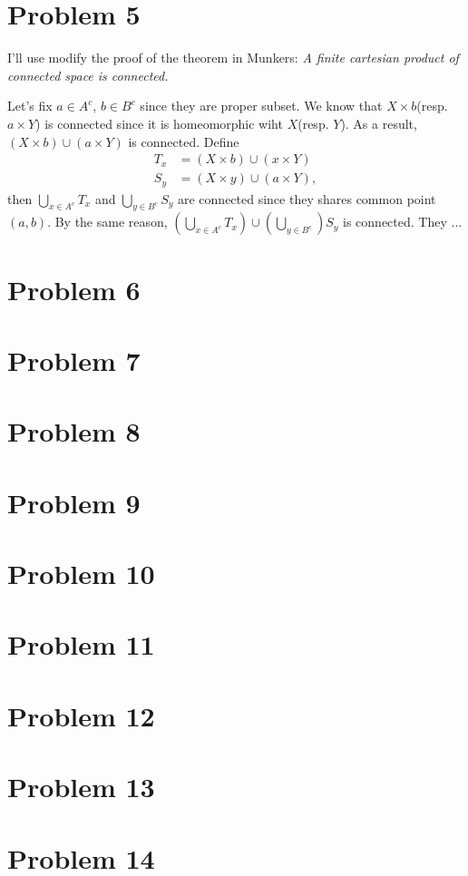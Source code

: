 \documentclass{article}
\begin{document}
\section*{Problem 5}
I'll use modify the proof of the theorem in Munkers: \textit{A finite cartesian product of connected space is connected.}

Let's fix $a\in A^c$, $b\in B^c$ since they are proper subset. We know that $X\times b$(resp. $a\times Y$) is connected since it is homeomorphic wiht $X$(resp. $Y$). As a result, $(X\times b) \cup (a\times Y)$ is connected. Define
\begin{equation*}
\begin{split}
T_x&=(X\times b)\cup (x\times Y) \\
S_y&=(X\times y)\cup (a\times Y),
\end{split}
\end{equation*}
then $\bigcup_{x\in A^c} T_x$ and $\bigcup_{y\in B^c} S_y$ are connected since they shares common point $(a,b)$. By the same reason, $\left(\bigcup_{x\in A^c} T_x\right) \cup \left(\bigcup_{y\in B^c}\right)S_y$ is connected. They ...
\section*{Problem 6}

\section*{Problem 7}
\section*{Problem 8}
\section*{Problem 9}
\section*{Problem 10}
\section*{Problem 11}
\section*{Problem 12}
\section*{Problem 13}
\section*{Problem 14}
\end{document}
